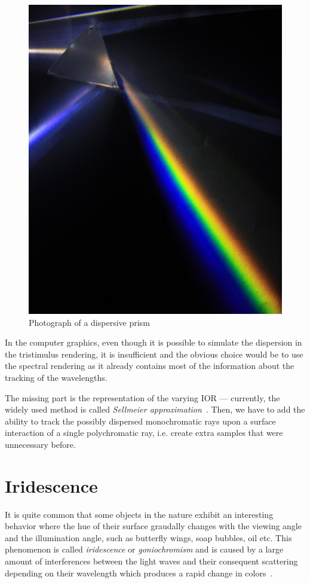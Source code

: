\begin{figure}[h]
	\centering
	\includegraphics[width=.6\linewidth]{img/dispersion.jpg}
	\caption[nikon]{Photograph of a dispersive prism\footnotemark}
	\label{fig:dispersion}
\end{figure}

In the computer graphics, even though it is possible to simulate the dispersion in the tristimulus rendering, it is insufficient and the obvious choice would be to use the spectral rendering as it already contains most of the information about the tracking of the wavelengths. 

The missing part is the representation of the varying IOR --- currently, the widely used method is called \emph{Sellmeier approximation}~\cite{wilkie2002tone}. Then, we have to add the ability to track the possibly dispersed monochromatic rays upon a surface interaction of a single polychromatic ray, i.e. create extra samples that were unnecessary before.

\section{Iridescence}
\label{sec:irid}

It is quite common that some objects in the nature exhibit an interesting behavior where the hue of their surface graudally changes with the viewing angle and the illumination angle, such as butterfly wings, soap bubbles, oil etc. This phenomenon is called \emph{iridescence} or \emph{goniochromism} and is caused by a large amount of interferences between the light waves and their consequent scattering depending on their wavelength which produces a rapid change in colors~\cite{belcour2017practical}.

